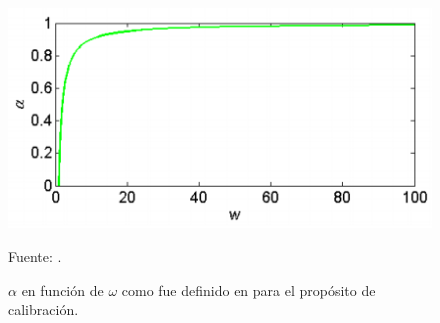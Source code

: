 \begin{figure}[ht]
	\includegraphics[width=12cm]{Images/budyko00.png}
	\centering
	\caption{$\alpha$ en función de $\omega$ como fue definido en \citet{Zhang2008} para el propósito de calibración.}
	Fuente: \citet{Krogh2011}.
	\label{fig:budyko00}
\end{figure}

